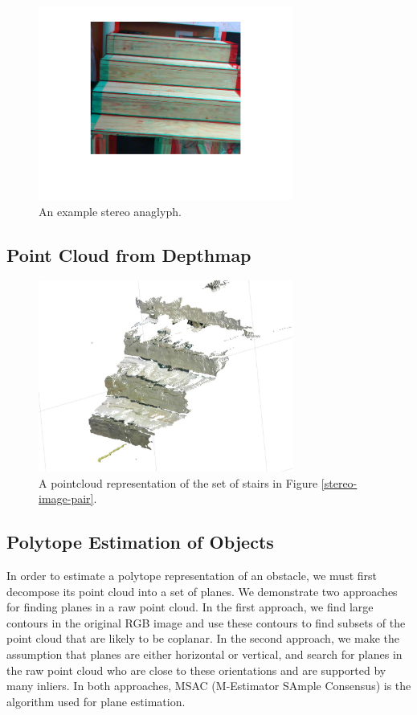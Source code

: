 \begin{figure}[!h]
\centering
\includegraphics[width=3.3in]{Sections/Figures/stereo_anaglyph.png}
\caption{An example stereo anaglyph.}
\label{stereo-anaglyph}
\end{figure}

\subsection{Point Cloud from Depthmap}

\begin{figure}[!h]
\centering
\includegraphics[width=3.3in]{Sections/Figures/example_stairs_pointcloud.jpg}
\caption{A pointcloud representation of the set of stairs in Figure \ref{stereo-image-pair}.}
\label{pointcloud-example}
\end{figure}

\subsection{Polytope Estimation of Objects}

In order to estimate a polytope representation of an obstacle, we must first decompose its point cloud into a set of planes.
We demonstrate two approaches for finding planes in a raw point cloud. In the first approach, we find large contours in the original RGB image and use these contours to find subsets of the point cloud that are likely to be coplanar. In the second approach, we make the assumption that planes are either horizontal or vertical, and search for planes in the raw point cloud who are close to these orientations and are supported by many inliers. In both approaches, MSAC (M-Estimator SAmple Consensus) is the algorithm used for plane estimation.

